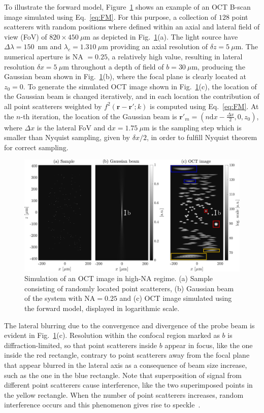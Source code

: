 To illustrate the forward model, Figure~\ref{fig:FM1} shows an example of an OCT B-scan image simulated using Eq.~\ref{eq:FM}. For this purpose, a collection of $128$ point scatterers with random positions where defined within an axial and lateral field of view (FoV) of $820\times 450~\mu$m as depicted in Fig.~\ref{fig:FM1}(a). The light source have $\Delta\lambda=150$~nm and $\lambda_c=1.310~\mu$m providing an axial resolution of $\delta z=5~\mu$m. The numerical aperture is NA $= 0.25$, a relatively high value, resulting in lateral resolution $\delta x=5~\mu$m throughout a depth of field of $b=30~\mu$m, producing the Gaussian beam shown in Fig.~\ref{fig:FM1}(b), where the focal plane is clearly located at $z_0=0$. To generate the simulated OCT image shown in Fig.~\ref{fig:FM1}(c), the location of the Gaussian beam is changed iteratively, and in each location the contribution of all point scatterers weighted by $f^2(\mathbf{r}-\mathbf{r'}; k)$ is computed using Eq.~\ref{eq:FM}. At the $n$-th iteration, the location of the Gaussian beam is $\mathbf{r}'_m=(n\text{d}x - \frac{\Delta x}{2},0,z_0)$, where $\Delta x$ is the lateral FoV and $\text{d}x = 1.75~\mu$m is the sampling step which is smaller than Nyquist sampling, given by $\delta x / 2$, in order to fulfill Nyquist theorem for correct sampling.

\begin{figure}[htb!]
    \centering
    \includegraphics[width=\textwidth]{Figures/TheoreticalBasis/FM-HighNA.pdf}
    \caption[Simulation of an OCT image in high-NA regime.]{Simulation of an OCT image in high-NA regime. (a) Sample consisting of randomly located point scatterers, (b) Gaussian beam of the system with NA$=0.25$ and (c) OCT image simulated using the forward model, displayed in logarithmic scale.}
    \label{fig:FM1}
\end{figure}

The lateral blurring due to the convergence and divergence of the probe beam is evident in Fig.~\ref{fig:FM1}(c). Resolution within the confocal region marked as $b$ is diffraction-limited, so that point scatterers inside $b$ appear in focus, like the one inside the red rectangle, contrary to point scatterers away from the focal plane that appear blurred in the lateral axis as a consequence of beam size increase, such as the one in the blue rectangle. Note that superposition of signal from different point scatterers cause interference, like the two superimposed points in the yellow rectangle. When the number of point scatterers increases, random interference occurs and this phenomenon gives rise to speckle~\cite{Goodman2007_Speckle}.

